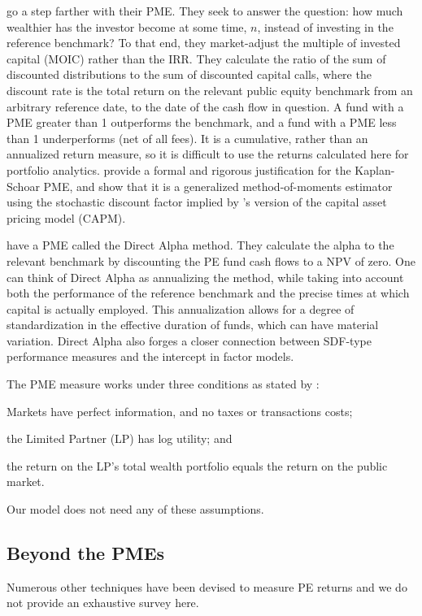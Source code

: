\documentclass[11pt]{article}
\begin{document}
\cite{Kaplan2005} go a step farther with their PME. They seek to answer the question: how much wealthier has the investor become at some time, $n$, instead of investing in the reference benchmark? To that end, they market-adjust the multiple of invested capital (MOIC) rather than the IRR. They calculate the ratio of the sum of discounted distributions to the sum of discounted capital calls, where the discount rate is the total return on the relevant public equity benchmark from an arbitrary reference date, to the date of the cash flow in question. A fund with a PME greater than 1 outperforms the benchmark, and a fund with a PME less than 1 underperforms (net of all fees). It is a cumulative, rather than an annualized return measure, so it is difficult to use the returns calculated here for portfolio analytics. \cite{Sorensen2013} provide a formal and rigorous justification for the Kaplan-Schoar PME, and show that it is a generalized method-of-moments estimator using the stochastic discount factor implied by \cite{Rubinstein1976}'s version of the capital asset pricing model (CAPM).

\cite{Gredil2014} have a PME called the Direct Alpha method. They calculate the alpha to the relevant benchmark by discounting the PE fund cash flows to a NPV of zero. One can think of Direct Alpha as annualizing the \cite{Kaplan2005} method, while taking into account both the performance of the reference benchmark and the precise times at which capital is actually employed. This annualization allows for a degree of standardization in the effective duration of funds, which can have material variation. Direct Alpha also forges a closer connection between SDF-type performance measures and the intercept in factor models.

The PME measure works under three conditions as stated by \cite{Sorensen2013}:
\begin{inparaenum}[(i)]
	\item Markets have perfect information, and no taxes or transactions costs;
	\item the Limited Partner (LP) has log utility; and
	\item the return on the LP's total wealth portfolio equals the return on the public market.
\end{inparaenum} Our model does not need any of these assumptions.

\subsection{Beyond the PMEs}
Numerous other techniques have been devised to measure PE returns and we do not provide an exhaustive survey here. 
\end{document}
